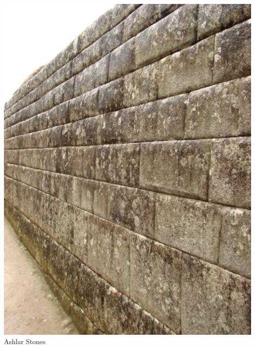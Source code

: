 \documentclass[11pt]{article}
\begin{document}
\begin{center}
\begin{minipage}[t]{0.45\textwidth}
\includegraphics[width=\textwidth]{ashlar-stones.png}\\
\vspace{0.5em}
Ashlar Stones
\end{minipage}
\end{center}
\vspace{1em}
\end{document}
